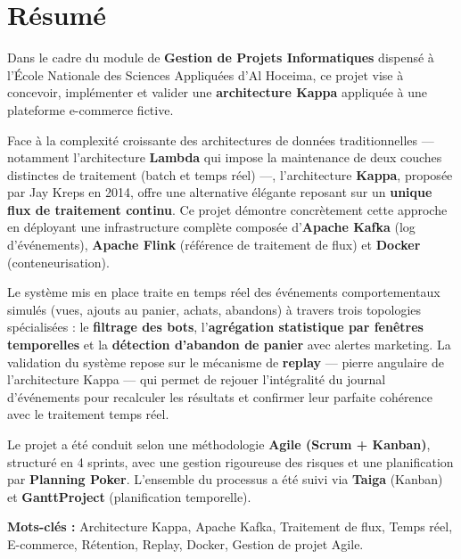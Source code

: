 
\chapter*{Résumé}

\vspace{0.5cm}

Dans le cadre du module de \textbf{Gestion de Projets Informatiques} dispensé à l'École Nationale des Sciences Appliquées d'Al Hoceima, ce projet vise à concevoir, implémenter et valider une \textbf{architecture Kappa} appliquée à une plateforme e-commerce fictive.

\vspace{0.3cm}

Face à la complexité croissante des architectures de données traditionnelles --- notamment l'architecture \textbf{Lambda} qui impose la maintenance de deux couches distinctes de traitement (batch et temps réel) ---, l'architecture \textbf{Kappa}, proposée par Jay Kreps en 2014, offre une alternative élégante reposant sur un \textbf{unique flux de traitement continu}. Ce projet démontre concrètement cette approche en déployant une infrastructure complète composée d'\textbf{Apache Kafka} (log d'événements), \textbf{Apache Flink} (référence de traitement de flux) et \textbf{Docker} (conteneurisation).

\vspace{0.3cm}

Le système mis en place traite en temps réel des événements comportementaux simulés (vues, ajouts au panier, achats, abandons) à travers trois topologies spécialisées : le \textbf{filtrage des bots}, l'\textbf{agrégation statistique par fenêtres temporelles} et la \textbf{détection d'abandon de panier} avec alertes marketing. La validation du système repose sur le mécanisme de \textbf{replay} --- pierre angulaire de l'architecture Kappa --- qui permet de rejouer l'intégralité du journal d'événements pour recalculer les résultats et confirmer leur parfaite cohérence avec le traitement temps réel.

\vspace{0.3cm}

Le projet a été conduit selon une méthodologie \textbf{Agile (Scrum + Kanban)}, structuré en 4 sprints, avec une gestion rigoureuse des risques et une planification par \textbf{Planning Poker}. L'ensemble du processus a été suivi via \textbf{Taiga} (Kanban) et \textbf{GanttProject} (planification temporelle).

\vspace{0.5cm}

\noindent\textbf{Mots-clés :} Architecture Kappa, Apache Kafka, Traitement de flux, Temps réel, E-commerce, Rétention, Replay, Docker, Gestion de projet Agile.

\vfill
